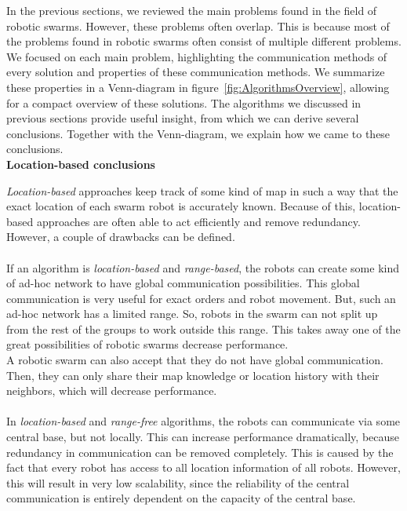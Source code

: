 
In the previous sections, we reviewed the main problems found in the field of robotic swarms. 
However, these problems often overlap.
This is because most of the problems found in robotic swarms often consist of multiple different problems. 
We focused on each main problem, highlighting the communication methods of every solution and properties of these communication methods. 
We summarize these properties in a Venn-diagram in figure~\ref{fig:AlgorithmsOverview}, allowing for a compact overview of these solutions.
The algorithms we discussed in previous sections provide useful insight, from which we can derive several conclusions.
Together with the Venn-diagram, we explain how we came to these conclusions. \\

\textbf{Location-based conclusions} 

\emph{Location-based} approaches keep track of some kind of map in such a way that the exact location of each swarm robot is accurately known.
Because of this, location-based approaches are often able to act efficiently and remove redundancy.
However, a couple of drawbacks can be defined.\\
\\
If an algorithm is \emph{location-based} and \emph{range-based}, the robots can create some kind of ad-hoc network to have global communication possibilities.
This global communication is very useful for exact orders and robot movement. 
But, such an ad-hoc network has a limited range. 
So, robots in the swarm can not split up from the rest of the groups to work outside this range. 
This takes away one of the great possibilities of robotic swarms decrease performance. \\
A robotic swarm can also accept that they do not have global communication.
Then, they can only share their map knowledge or location history with their neighbors, which will decrease performance.  \\
\\
In \emph{location-based} and \emph{range-free} algorithms, the robots can communicate via some central base, but not locally. 
This can increase performance dramatically, because redundancy in communication can be removed completely.
This is caused by the fact that every robot has access to all location information of all robots.
However, this will result in very low scalability, since the reliability of the central communication is entirely dependent on the capacity of the central base.

